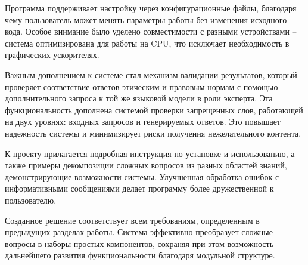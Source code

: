 Программа поддерживает настройку через конфигурационные файлы, благодаря чему пользователь может менять параметры работы без изменения исходного кода. Особое внимание было уделено совместимости с разными устройствами -- система оптимизирована для работы на CPU, что исключает необходимость в графических ускорителях.

Важным дополнением к системе стал механизм валидации результатов, который проверяет соответствие ответов этическим и правовым нормам с помощью дополнительного запроса к той же языковой модели в роли эксперта. Эта функциональность дополнена системой проверки запрещенных слов, работающей на двух уровнях: входных запросов и генерируемых ответов. Это повышает надежность системы и минимизирует риски получения нежелательного контента.

К проекту прилагается подробная инструкция по установке и использованию, а также примеры декомпозиции сложных вопросов из разных областей знаний, демонстрирующие возможности системы. Улучшенная обработка ошибок с информативными сообщениями делает программу более дружественной к пользователю.

Созданное решение соответствует всем требованиям, определенным в предыдущих разделах работы. Система эффективно преобразует сложные вопросы в наборы простых компонентов, сохраняя при этом возможность дальнейшего развития функциональности благодаря модульной структуре.